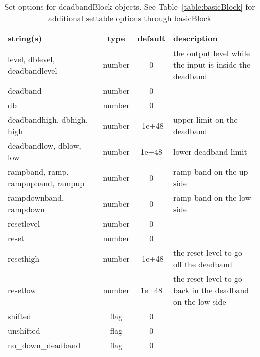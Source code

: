 \begin{table}[ht]
\centering
\begin{tabular}{p{5cm} c c p{7cm}}
\hline
string(s) & type & default & description \\
\hline
level, dblevel, deadbandlevel & number & 0 & the output level while the input is inside the deadband\\
deadband & number & 0 & \\
db & number & 0 & \\
deadbandhigh, dbhigh, high & number & -1e+48 & upper limit on the deadband\\
deadbandlow, dblow, low & number & 1e+48 & lower deadband limit\\
rampband, ramp, rampupband, rampup & number & 0 & ramp band on the up side\\
rampdownband, rampdown & number & 0 & ramp band on the low side\\
resetlevel & number & 0 & \\
reset & number & 0 & \\
resethigh & number & -1e+48 & the reset level to go off the deadband\\
resetlow & number & 1e+48 & the reset level to go back in the deadband on the low side\\
shifted & flag & 0 & \\
unshifted & flag & 0 & \\
no\_down\_deadband & flag & 0 & \\
\hline
\end{tabular}
\caption{Set options for deadbandBlock objects. See Table~\ref{table:basicBlock} for additional settable options through basicBlock}
\label{table:deadbandBlock}
\end{table}
